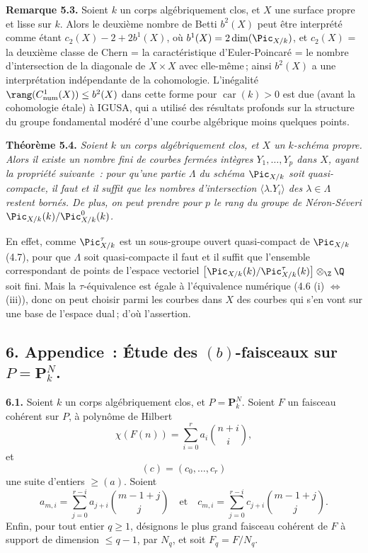 \textbf{Remarque 5.3.} Soient \(k\) un corps alg\'ebriquement clos, et \(X\) une surface propre et lisse sur \(k\). Alors le deuxi\`eme nombre de Betti \(b^2(X)\) peut \^etre interpr\'et\'e comme \'etant \(c_2(X)-2+2b^1(X)\), o\`u \(b^1(X)=2\dim(\Pic_{X/k})\), et \(c_2(X)\) = la deuxi\`eme classe de Chern = la caract\'eristique d'Euler-Poincar\'e = le nombre d'intersection de la diagonale de \(X\times X\) avec elle-m\^eme\,; ainsi \(b^2(X)\) a une interpr\'etation ind\'ependante de la cohomologie. L'in\'egalit\'e \(\rang(C^1_{\rm num}(X))\le b^2(X)\) dans cette forme pour \(\operatorname{car}(k)>0\) est due (avant la cohomologie \'etale) \`a IGUSA, qui a utilis\'e des r\'esultats profonds sur la structure du groupe fondamental mod\'er\'e d'une courbe alg\'ebrique moins quelques points.

\textbf{Th\'eor\`eme 5.4.} \emph{Soient \(k\) un corps alg\'ebriquement clos, et \(X\) un \(k\)-sch\'ema propre. Alors il existe un nombre fini de courbes ferm\'ees int\`egres \(Y_1,\ldots,Y_p\) dans \(X\), ayant la propri\'et\'e suivante~: pour qu'une partie \(\Lambda\) du sch\'ema \(\Pic_{X/k}\) soit quasi-compacte, il faut et il suffit que les nombres d'intersection \(\langle\lambda.Y_i\rangle\) des \(\lambda\in\Lambda\) restent born\'es. De plus, on peut prendre pour \(p\) le rang du groupe de N\'eron-S\'everi \(\Pic_{X/k}(k)/\Pic^0_{X/k}(k)\).}

En effet, comme \(\Pic^\tau_{X/k}\) est un sous-groupe ouvert quasi-compact de \(\Pic_{X/k}\) (4.7), pour que \(\Lambda\) soit quasi-compacte il faut et il suffit que l'ensemble correspondant de points de l'espace vectoriel \(\bigl[\Pic_{X/k}(k)/\Pic^\tau_{X/k}(k)\bigr]\otimes_{\Z}\Q\) soit fini. Mais la \(\tau\)-\'equivalence est \'egale \`a l'\'equivalence num\'erique (4.6 (i) \(\Longleftrightarrow\) (iii)), donc on peut choisir parmi les courbes dans \(X\) des courbes qui s'en vont sur une base de l'espace dual\,; d'o\`u l'assertion.

\subsection*{6. Appendice~: \'Etude des $(b)$-faisceaux sur $P=\mathbf P^N_k$.}

\textbf{6.1.} Soient $k$ un corps alg\'ebriquement clos, et $P=\mathbf P^N_k$. Soient $F$ un faisceau coh\'erent sur $P$, \`a polyn\^ome de Hilbert
\[
   \chi(F(n))=\sum_{i=0}^{r} a_i \binom{n+i}{i},
\]
et
\[
   (c)=(c_0,\ldots,c_r)
\]
une suite d'entiers $\ge (a)$. Soient
\[
   a_{m,i}=\sum_{j=0}^{r-i}a_{j+i}\binom{m-1+j}{j}\quad\text{et}\quad c_{m,i}=\sum_{j=0}^{r-i}c_{j+i}\binom{m-1+j}{j}.
\]
Enfin, pour tout entier $q\ge1$, d\'esignons le plus grand faisceau coh\'erent de $F$ \`a support de dimension $\le q-1$, par $N_q$, et soit $F_q=F/N_q$.

